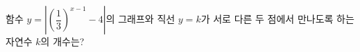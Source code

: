 함수 $y=\left|\left(\dfrac{1}{3}\right)^{x-1}-4\right|$의 그래프와 직선 $y=k$가 서로 다른 두 점에서 만나도록 하는 자연수 $k$의 개수는?
